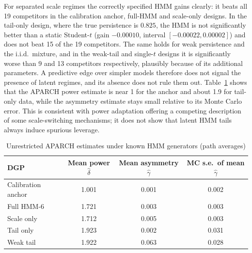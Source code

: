\documentclass[11pt,a4paper]{article}
\theoremstyle{plain}
\theoremstyle{remark}
\begin{document}
For separated scale regimes the correctly specified HMM gains clearly: it beats all 19 competitors in the calibration anchor, full-HMM and scale-only designs. In the tail-only design, where the true persistence is $0.825$, the HMM is not significantly better than a static Student-$t$ (gain $-0.00010$, interval $[-0.00022,0.00002]$) and does not beat 15 of the 19 competitors. The same holds for weak persistence and the i.i.d.\ mixture, and in the weak-tail and single-$t$ designs it is significantly worse than 9 and 13 competitors respectively, plausibly because of its additional parameters. A predictive edge over simpler models therefore does not signal the presence of latent regimes, and its absence does not rule them out. Table~\ref{tab:aparch} shows that the APARCH power estimate is near 1 for the anchor and about 1.9 for tail-only data, while the asymmetry estimate stays small relative to its Monte Carlo error. This is consistent with power adaptation \citep{ding1993} offering a competing description of some scale-switching mechanisms; it does not show that latent HMM tails always induce spurious leverage.

\begin{table}[ht]
\centering\small
\caption{Unrestricted APARCH estimates under known HMM generators (path averages)}\label{tab:aparch}
\begin{tabular}{lccc}
\toprule
DGP & Mean power $\hat\delta$ & Mean asymmetry $\hat\gamma$ & MC s.e.\ of mean $\hat\gamma$\\
\midrule
Calibration anchor & 1.001 & 0.001 & 0.002\\
Full HMM-6 & 1.721 & 0.003 & 0.003\\
Scale only & 1.712 & 0.005 & 0.003\\
Tail only & 1.923 & 0.002 & 0.031\\
Weak tail & 1.922 & 0.063 & 0.028\\
\bottomrule
\end{tabular}
\end{table}
\end{document}
